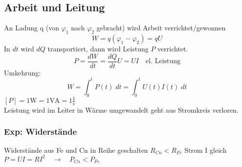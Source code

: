 \documentclass[titlepage,12pt,a4paper,ngerman]{report}
\newcommand{\tx}[1]{\textrm{#1}}
\begin{document}
\subsection{Arbeit und Leitung}
An Ladung q (von $\varphi_1$ nach $\varphi_2$ gebracht) wird Arbeit verrichtet/gewonnen
$$W = q(\varphi_1 - \varphi_2) = q U$$
In $dt$ wird $dQ$ transportiert, dann wird Leistung $P$ verrichtet.
$$\boxed{P = \frac{dW}{dt} = \frac{dQ}{dt} U = U I} \quad \tx{el. Leistung} $$
Umkehrung: $$W = \int_0^t P(t) \; dt = \int_0^t U(t) I(t) \; dt$$
$[P] = 1 \tx{W} = 1 \tx{VA} = 1 \frac{\tx{I}}{\tx{s}}$\\
Leistung wird im Leiter in Wärme umgewandelt geht aus Stromkreis verloren.
\subsubsection{Exp: Widerstände}
Widerstände aus Fe und Cn in Reihe geschalten $R_{Cn} < R_{Fe}$ Strom I gleich \\
$P = UI = R I^2 \quad \rightarrow \quad P_{Cn} < P_{Fe}$

\end{document}
